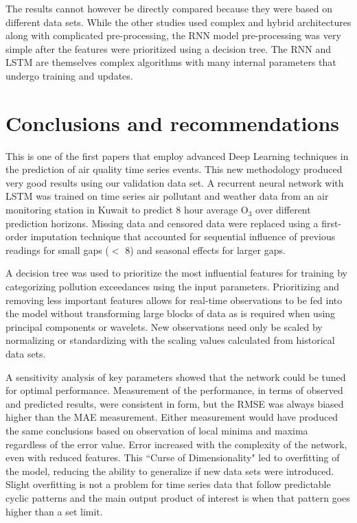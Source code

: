 \documentclass[preprint,12pt,a4paper,authoryear]{elsarticle}
\begin{document}
\begin{linenumbers}
%
The results cannot however be directly compared because they were based on different data sets. While the other studies used complex and hybrid architectures along with complicated pre-processing, the RNN model pre-processing was very simple after the features were prioritized using a decision tree. The RNN and LSTM are themselves complex algorithms with many internal parameters that undergo training and updates.
 
\section{Conclusions and recommendations}
This is one of the first papers that employ advanced Deep Learning techniques in the prediction of air quality time series events. This new methodology produced very good results using our validation data set. A recurrent neural network with LSTM was trained on time series air pollutant and weather data from an air monitoring station in Kuwait to predict 8 hour average O$_{3}$ over different prediction horizons. Missing data and censored data were replaced using a first-order imputation technique that accounted for sequential influence of previous readings for small gaps ($<$ 8) and seasonal effects for larger gaps. 

A decision tree was used to prioritize the most influential features for training by categorizing pollution exceedances using the input parameters. Prioritizing and removing less important features allows for real-time observations to be fed into the model without transforming large blocks of data as is required when using principal components or wavelets. New observations need only be scaled by normalizing or standardizing with the scaling values calculated from historical data sets. 

A sensitivity analysis of key parameters showed that the network could be tuned for optimal performance. Measurement of the performance, in terms of observed and predicted results, were consistent in form, but the RMSE was always biased higher than the MAE measurement. Either measurement would have produced the same conclusions based on observation of local minima and maxima regardless of the error value. Error increased with the complexity of the network, even with reduced features. This ``Curse of Dimensionality" led to overfitting of the model, reducing the ability to generalize if new data sets were introduced. Slight overfitting is not a problem for time series data that follow predictable cyclic patterns and the main output product of interest is when that pattern goes higher than a set limit.


\end{linenumbers}
\end{document}
